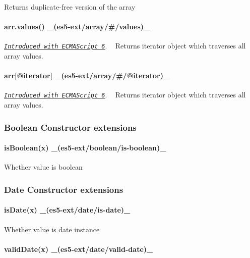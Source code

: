 Returns duplicate-\/free version of the array

\paragraph*{arr.\+values() \+\_\+(es5-\/ext/array/\#/values)\+\_\+}

\href{http://people.mozilla.org/~jorendorff/es6-draft.html#sec-array.prototype.values}{\tt {\itshape Introduced with E\+C\+M\+A\+Script 6}}. ~\newline
Returns iterator object which traverses all array values.

\paragraph*{arr\mbox{[}@iterator\mbox{]} \+\_\+(es5-\/ext/array/\#/@iterator)\+\_\+}

\href{http://people.mozilla.org/~jorendorff/es6-draft.html#sec-array.prototype-@@iterator}{\tt {\itshape Introduced with E\+C\+M\+A\+Script 6}}. ~\newline
Returns iterator object which traverses all array values.

\subsubsection*{Boolean Constructor extensions}

\paragraph*{is\+Boolean(x) \+\_\+(es5-\/ext/boolean/is-\/boolean)\+\_\+}

Whether value is boolean

\subsubsection*{Date Constructor extensions}

\paragraph*{is\+Date(x) \+\_\+(es5-\/ext/date/is-\/date)\+\_\+}

Whether value is date instance

\paragraph*{valid\+Date(x) \+\_\+(es5-\/ext/date/valid-\/date)\+\_\+}

